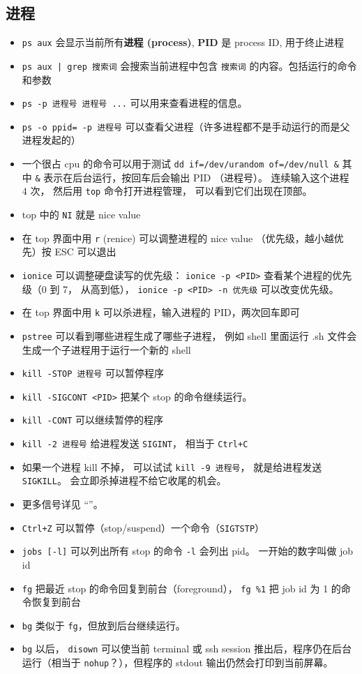 \subsection{进程}
\begin{itemize}
\item \verb`ps aux` 会显示当前所有\textbf{进程 (process)}, \textbf{PID} 是 process ID, 用于终止进程
\item \verb`ps aux | grep 搜索词` 会搜索当前进程中包含 \verb`搜索词` 的内容。包括运行的命令和参数
\item \verb`ps -p 进程号 进程号 ...` 可以用来查看进程的信息。
\item \verb`ps -o ppid= -p 进程号` 可以查看父进程（许多进程都不是手动运行的而是父进程发起的）
\item 一个很占 cpu 的命令可以用于测试 \verb`dd if=/dev/urandom of=/dev/null &` 其中 \verb`&` 表示在后台运行，按回车后会输出 PID （进程号）。 连续输入这个进程 4 次， 然后用 \verb`top` 命令打开进程管理， 可以看到它们出现在顶部。
\item top 中的 \verb`NI` 就是 nice value
\item 在 top 界面中用 \verb`r` (renice) 可以调整进程的 nice value （优先级，越小越优先）按 ESC 可以退出
\item \verb`ionice` 可以调整硬盘读写的优先级： \verb`ionice -p <PID>` 查看某个进程的优先级（0 到 7， 从高到低）， \verb`ionice -p <PID> -n 优先级` 可以改变优先级。
\item 在 top 界面中用 \verb`k` 可以杀进程，输入进程的 PID，两次回车即可
\item \verb`pstree` 可以看到哪些进程生成了哪些子进程， 例如 shell 里面运行 .sh 文件会生成一个子进程用于运行一个新的 shell
\item \verb`kill -STOP 进程号` 可以暂停程序
\item \verb`kill -SIGCONT <PID>` 把某个 stop 的命令继续运行。
\item \verb`kill -CONT` 可以继续暂停的程序
\item \verb`kill -2 进程号` 给进程发送 \verb`SIGINT`， 相当于 \verb`Ctrl+C`
\item 如果一个进程 kill 不掉， 可以试试 \verb`kill -9 进程号`， 就是给进程发送 \verb`SIGKILL`。 会立即杀掉进程不给它收尾的机会。
\item 更多信号详见 “”。
\item \verb`Ctrl+Z` 可以暂停（stop/suspend）一个命令（\verb`SIGTSTP`）
\item \verb`jobs [-l]` 可以列出所有 stop 的命令 \verb`-l` 会列出 pid。 一开始的数字叫做 job id
\item \verb`fg` 把最近 stop 的命令回复到前台（foreground）， \verb`fg %1` 把 job id 为 1 的命令恢复到前台
\item \verb`bg` 类似于 \verb`fg`，但放到后台继续运行。
\item \verb`bg` 以后， \verb`disown` 可以使当前 terminal 或 ssh session 推出后，程序仍在后台运行（相当于 \verb`nohup`？），但程序的 stdout 输出仍然会打印到当前屏幕。
\end{itemize}

